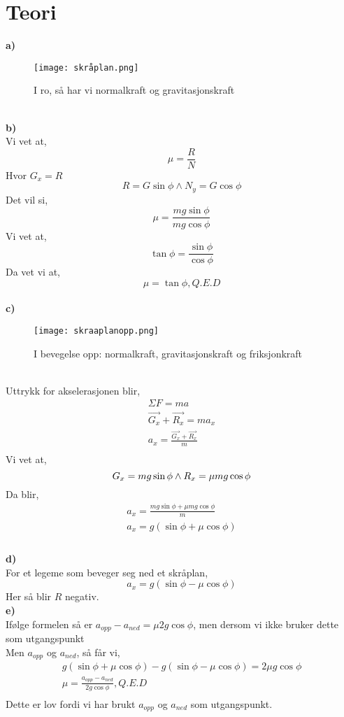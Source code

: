\documentclass[a4paper]{article}
\begin{document}
\section{Teori} %
\textbf{a)}
\label{sec:teori}
\begin{figure}[h]
  \centering
  \texttt{[image: skråplan.png]}
  \caption{I ro, så har vi normalkraft og gravitasjonskraft}
  \label{fig:skråplan.png} 
\end{figure} \\
\textbf{b)} \\
Vi vet at,	
\[
\mu = \frac{R}{N}
\]
Hvor $G_x = R$
\[
R = G\sin{\phi} \wedge N_y = G\cos{\phi}
\]
Det vil si,
\[
\mu = \frac{mg\sin{\phi}}{mg\cos{\phi}}
\]
Vi vet at,
\[
\tan{\phi} = \frac{\sin{\phi}}{\cos{\phi}}
\]
Da vet vi at,
\[
\mu = \tan{\phi}, Q.E.D
\] \\
\textbf{c)} \\
\begin{figure}[h]
  \centering
  \texttt{[image: skraaplanopp.png]}
  \caption{I bevegelse opp: normalkraft, gravitasjonskraft og friksjonkraft}
  \label{fig:skraaplanopp.png} 
\end{figure} \\
Uttrykk for akselerasjonen blir,
\[
\begin{gathered}
	\Sigma F = ma  \\
	\vec{G_x} + \vec{R_x} = ma_x  \\
	a_x = \frac{\vec{G_x} + \vec{R_x}}{m} \\
\end{gathered}
\]
Vi vet at,
\[
G_x = mg\sin{\phi} \wedge R_x = \mu mg\cos{\phi} \\
\]
Da blir,
\[
\begin{gathered}
	a_x = \frac{mg \sin{\phi} + \mu mg \cos{\phi}}{m} \\
	a_x = g(\sin{\phi} + \mu \cos{\phi}) \\
\end{gathered}
\] \\
\textbf{d)} \\
For et legeme som beveger seg ned et skråplan,
\[
a_x = g(\sin{\phi} - \mu \cos{\phi})
\]
Her så blir $R$ negativ. \\
\textbf{e)} \\
Ifølge formelen så er $a_{opp} - a_{ned} = \mu 2g\cos{\phi}$, men dersom vi ikke bruker dette som utgangspunkt \\
Men $a_{opp}$ og $a_{ned}$, så får vi, \\
\[
\begin{gathered}
	g(\sin{\phi} + \mu\cos{\phi}) - g(\sin{\phi} - \mu\cos{\phi}) = 2\mu g \cos{\phi} \\
	\mu = \frac{a_{opp} - a_{ned}}{2g\cos{\phi}}, Q.E.D \\
\end{gathered}
\]
Dette er lov fordi vi har brukt $a_{opp}$ og $a_{ned}$ som utgangspunkt.
\end{document}

